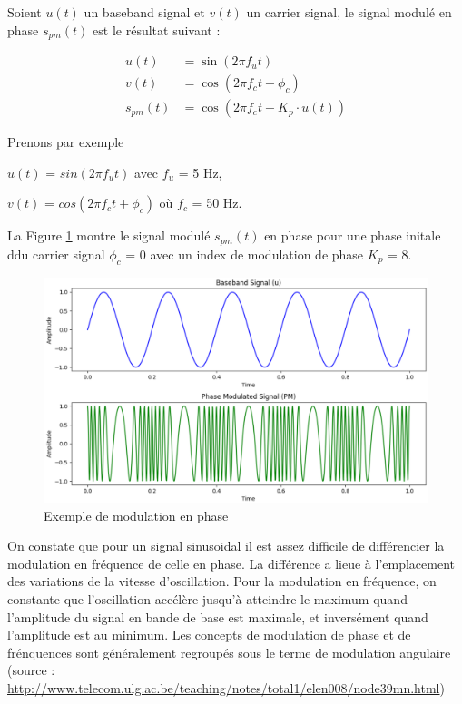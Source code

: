 Soient $u(t)$ un baseband signal et $v(t)$ un carrier signal, le signal modulé en phase $s_{pm}(t)$ est le résultat suivant :

\begin{align}
    u(t) &= \sin(2\pi f_{u}t) \\
    v(t) &= \cos(2\pi f_{c}t + \phi_{c}) \\
    s_{pm}(t) &= \cos\left(2\pi f_{c}t + K_{p} \cdot u(t)\right)
\end{align}

\vspace{0.1cm}

Prenons par exemple

\vspace{0.1cm}

$u(t)$ = $sin(2\pi f_{u}t)$ avec $f_{u}$ = 5 Hz,

$v(t)$ = $cos(2\pi f_{c}t + \phi_{c})$ où $f_{c}$ = 50 Hz.

\vspace{0.1cm}

La Figure \ref{term3} montre le signal modulé $s_{pm}(t)$ en phase pour une phase initale ddu carrier signal $\phi_{c}$ = 0 avec un index de modulation de phase $K_{p}$ = 8.

\newpage

\begin{figure}[h]
\centering

\includegraphics[scale=0.5]{images/PM_mod.PNG}
\caption{Exemple de modulation en phase}\label{term3}
\end{figure}

On constate que pour un signal sinusoidal il est assez difficile de différencier la modulation en fréquence de celle en phase. La différence a lieue à l'emplacement des variations de la vitesse d'oscillation. Pour la modulation en fréquence, on constante que l'oscillation accélère jusqu'à atteindre le maximum quand l'amplitude du signal en bande de base est maximale, et inversément quand l'amplitude est au minimum. Les concepts de modulation de phase et de frénquences sont généralement regroupés sous le terme de modulation angulaire (source : \href{http://www.telecom.ulg.ac.be/teaching/notes/total1/elen008/node39_mn.html}{http://www.telecom.ulg.ac.be/teaching/notes/total1/elen008/node39mn.html})

